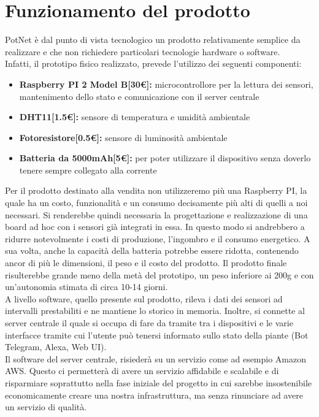 \section{Funzionamento del prodotto}

PotNet è dal punto di vista tecnologico un prodotto relativamente semplice da realizzare e che non richiedere particolari tecnologie hardware o software. \\Infatti, il prototipo fisico realizzato, prevede l'utilizzo dei seguenti componenti:

\begin{itemize}
	\item \textbf{Raspberry PI 2 Model B[30€]:} microcontrollore per la lettura dei sensori, mantenimento dello stato e comunicazione con il server centrale
	\item \textbf{DHT11[1.5€]:} sensore di temperatura e umidità ambientale
	\item \textbf{Fotoresistore[0.5€]:} sensore di luminosità ambientale
	\item \textbf{Batteria da 5000mAh[5€]:} per poter utilizzare il dispositivo senza doverlo tenere sempre collegato alla corrente
\end{itemize}

Per il prodotto destinato alla vendita non utilizzeremo più una Raspberry PI, la quale ha un costo, funzionalità e un consumo decisamente più alti di quelli a noi necessari. Si renderebbe quindi necessaria la progettazione e realizzazione di una board ad hoc con i sensori già integrati in essa. In questo modo si andrebbero a ridurre notevolmente i costi di produzione, l'ingombro e il consumo energetico. A sua volta, anche la capacità della batteria potrebbe essere ridotta, contenendo ancor di più le dimensioni, il peso e il costo del prodotto. Il prodotto finale risulterebbe grande meno della metà del prototipo, un peso inferiore ai 200g e con un'autonomia stimata di circa 10-14 giorni. \\

A livello software, quello presente sul prodotto, rileva i dati dei sensori ad intervalli prestabiliti e ne mantiene lo storico in memoria. Inoltre, si connette al server centrale il quale si occupa di fare da tramite tra i dispositivi e le varie interfacce tramite cui l'utente può tenersi informato sullo stato della piante (Bot Telegram, Alexa, Web UI).\\ Il software del server centrale, risiederà su un servizio come ad esempio Amazon AWS. Questo ci permetterà di avere un servizio affidabile e scalabile e di risparmiare soprattutto nella fase iniziale del progetto in cui sarebbe insostenibile economicamente creare una nostra infrastruttura, ma senza rinunciare ad avere un servizio di qualità.

